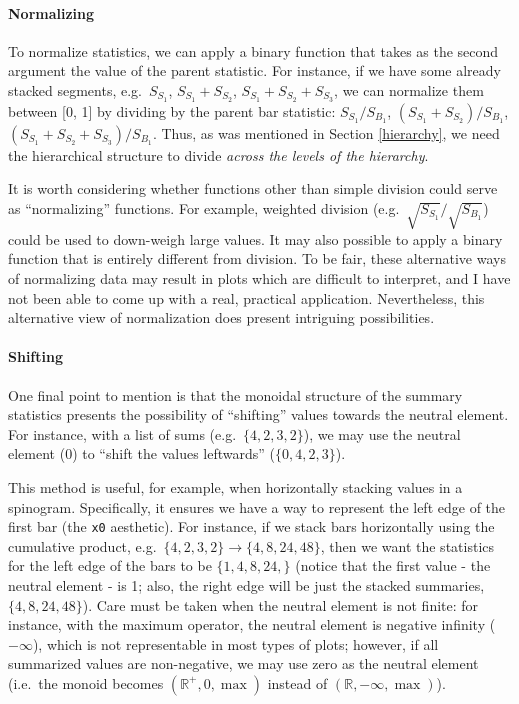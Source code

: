 \documentclass[
  openany]{book}
\theoremstyle{definition}
\theoremstyle{definition}
\theoremstyle{definition}
\theoremstyle{definition}
\theoremstyle{remark}
\begin{document}
\paragraph{Normalizing}\label{normalizing}

To normalize statistics, we can apply a binary function that takes as the second argument the value of the parent statistic. For instance, if we have some already stacked segments, e.g.~\(S_{S_1}\), \(S_{S_1} + S_{S_2}\), \(S_{S_1} + S_{S_2} + S_{S_3}\), we can normalize them between {[}0, 1{]} by dividing by the parent bar statistic: \(S_{S_1} / S_{B_1}\), \((S_{S_1} + S_{S_2}) / S_{B_1}\), \((S_{S_1} + S_{S_2} + S_{S_3}) / S_{B_1}\). Thus, as was mentioned in Section \ref{hierarchy}, we need the hierarchical structure to divide \emph{across the levels of the hierarchy}.

It is worth considering whether functions other than simple division could serve as ``normalizing'' functions. For example, weighted division (e.g.~\(\sqrt{S_{S_1}} / \sqrt{S_{B_1}}\)) could be used to down-weigh large values. It may also possible to apply a binary function that is entirely different from division. To be fair, these alternative ways of normalizing data may result in plots which are difficult to interpret, and I have not been able to come up with a real, practical application. Nevertheless, this alternative view of normalization does present intriguing possibilities.

\paragraph{Shifting}\label{shifting}

One final point to mention is that the monoidal structure of the summary statistics presents the possibility of ``shifting'' values towards the neutral element. For instance, with a list of sums (e.g.~\(\{ 4, 2, 3, 2 \}\)), we may use the neutral element (0) to ``shift the values leftwards'' (\(\{ 0, 4, 2, 3 \}\)).

This method is useful, for example, when horizontally stacking values in a spinogram. Specifically, it ensures we have a way to represent the left edge of the first bar (the \texttt{x0} aesthetic). For instance, if we stack bars horizontally using the cumulative product, e.g.~\(\{ 4, 2, 3, 2 \} \to \{ 4, 8, 24, 48 \}\), then we want the statistics for the left edge of the bars to be \(\{ 1, 4, 8, 24, \}\) (notice that the first value - the neutral element - is 1; also, the right edge will be just the stacked summaries, \(\{ 4, 8, 24, 48 \}\)). Care must be taken when the neutral element is not finite: for instance, with the maximum operator, the neutral element is negative infinity (\(-\infty\)), which is not representable in most types of plots; however, if all summarized values are non-negative, we may use zero as the neutral element (i.e.~the monoid becomes \((\mathbb{R}^+, 0, \max)\) instead of \((\mathbb{R}, -\infty, \max)\)).
\end{document}
